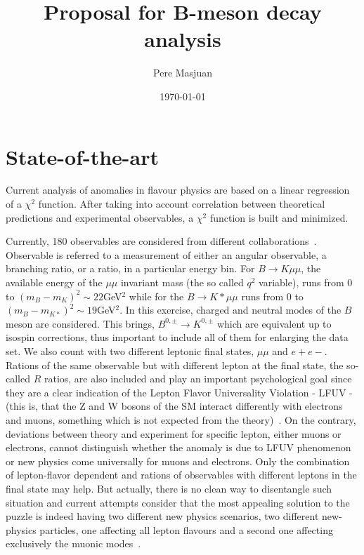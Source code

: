 \documentclass[11pt,amsmath,amssymb]{article}
\begin{document}
\title{Proposal for B-meson decay analysis}
\author{Pere Masjuan}
\date{\today}
\maketitle

\section{State-of-the-art}

Current analysis of anomalies in flavour physics are based on a linear regression of a $\chi^2$ function.
After taking into account correlation between theoretical predictions and experimental observables,
a $\chi^2$ function is built and minimized.

Currently, 180 observables are considered from different collaborations~\cite{Aaij:2019wad,BelleRK,Aaij:2014pli,Abdesselam:2019wac,Aaboud:2018mst,Wehle:2016yoi,Abdesselam:2016llu}. Observable is referred to a measurement of either an angular
observable, a branching ratio, or a ratio, in a particular energy bin. For $B \to K \mu\mu$, the available 
energy of the $\mu\mu$ invariant mass (the so called $q^2$ variable), runs from $0$ to $(m_B - m_K)^2 \sim 22$GeV$^2$
while for the $B \to K* \mu\mu$ runs from $0$ to $(m_B - m_{K*})^2 \sim 19$GeV$^2$.
In this exercise, charged and neutral modes of the $B$ meson are considered. This brings, $B^{0,\pm} \to K^{0,\pm}$ which
are equivalent up to isospin corrections, thus important to include all of them for enlarging the data set. We also count
with two different leptonic final states, $\mu\mu$ and $e+e-$. Rations of the same observable but with different lepton
at the final state, the so-called $R$ ratios, are also included and play an important psychological goal since they are a clear
indication of the Lepton Flavor Universality Violation - LFUV - (this is, that the Z and W bosons of the SM interact differently with electrons
and muons, something which is not expected from the theory)~\cite{Vicente:2020usa}.
On the contrary, deviations between theory and experiment for specific lepton, either muons or electrons, cannot distinguish
whether the anomaly is due to LFUV phenomenon or new physics come universally for muons and electrons. Only the combination
of lepton-flavor dependent and rations of observables with different leptons in the final state may help. But actually, there is no
clean way to disentangle such situation and current attempts consider that the most appealing solution to the puzzle is indeed
having two different new physics scenarios, two different new-physics particles, one affecting all lepton flavours and a second one
affecting exclusively the muonic modes~\cite{Alguero:2018nvb}.
\end{document}

